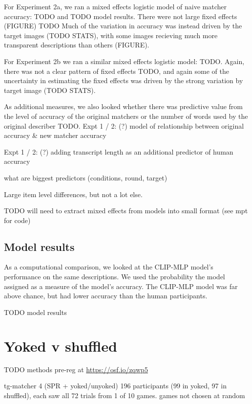 \documentclass[10pt, letterpaper]{article}
\begin{document}
For Experiment 2a, we ran a mixed effects logistic model of naive
matcher accuracy: TODO and TODO model results. There were not large
fixed effects (FIGURE) TODO Much of the variation in accuracy was
instead driven by the target images (TODO STATS), with some images
recieving much more transparent descriptions than others (FIGURE).

For Experiment 2b we ran a similar mixed effects logistic model: TODO.
Again, there was not a clear pattern of fixed effects TODO, and again
some of the uncertainty in estimating the fixed effects was driven by
the strong variation by target image (TODO STATS).

As additional measures, we also looked whether there was predictive
value from the level of accuracy of the original matchers or the number
of words used by the original describer TODO. Expt 1 / 2: (?) model of
relationship between original accuracy \& new matcher accuracy

Expt 1 / 2: (?) adding transcript length as an additional predictor of
human accuracy

what are biggest predictors (conditions, round, target)

Large item level differences, but not a lot else.

TODO will need to extract mixed effects from models into small format
(see mpt for code)

\subsection{Model results}\label{model-results}

As a computational comparison, we looked at the CLIP-MLP model's
performance on the same descriptions. We used the probability the model
assigned as a measure of the model's accuracy. The CLIP-MLP model was
far above chance, but had lower accuracy than the human participants.

TODO model results

\section{Yoked v shuffled}\label{yoked-v-shuffled}

TODO methods pre-reg at \url{https://osf.io/zqwp5}

tg-matcher 4 (SPR + yoked/unyoked) 196 participants (99 in yoked, 97 in
shuffled), each saw all 72 trials from 1 of 10 games. games not chosen
at random
\end{document}

